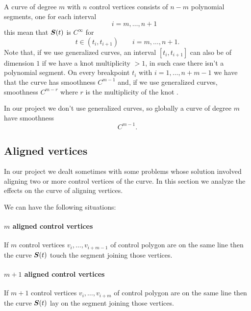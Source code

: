 \documentclass[dissertation.tex]{subfiles}
\begin{document}
A \bs curve of degree $m$ with $n$ control vertices consists of
$n-m$ polynomial segments, one for each 
interval 
\begin{equation*}
[t_i,t_{i+1}]\qquad i=m,\dots,n+1  
\end{equation*}
this mean that $\boldsymbol{S}(t)$ is $C^\infty$ for
\begin{equation*}
t\in(t_i,t_{i+1})\qquad i=m,\dots,n+1.
\end{equation*}
Note that, if we use generalized \bs curves, an interval
$[t_i,t_{i+1}]$ can also be of dimension $1$ if
we have a knot multiplicity $>1$, in
such case there isn't a polynomial segment.
On every breakpoint $t_i$ with $i=1,\dots,n+m-1$ we have that the curve has
smoothness $C^{m-1}$
and, if we use generalized \bs curves, smoothness $C^{m-r}$ where $r$ is the
multiplicity of the knot \cite{farin}.

In our project we don't use generalized \bs curves, so globally a
curve of degree $m$ have smoothness
\begin{equation*}
  C^{m-1}.
\end{equation*}

\subsection{Aligned vertices}\label{sec:alignedVertices}
In our project we dealt sometimes with some problems whose solution
involved aligning two or more control vertices of the curve. In this
section we analyze the effects on the curve of aligning vertices.

We can have the following situations:
\paragraph{$m$ aligned control vertices}
If $m$ control vertices $v_i,\dots,v_{i+m-1}$ of control polygon are on the same line then
the curve $\boldsymbol{S}(t)$ touch the segment joining those vertices.

\paragraph{$m+1$ aligned control vertices}
If $m+1$ control vertices $v_i,\dots,v_{i+m}$ of control polygon are on the same line then
the curve $\boldsymbol{S}(t)$ lay on the segment joining those vertices.
\end{document}
